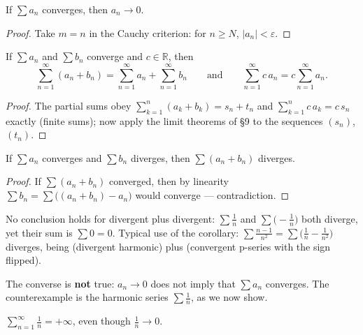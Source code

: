 \documentclass[11pt]{report}
\begin{document}
\begin{corbox}
If $\sum a_n$ converges, then $a_n \to 0$.
\end{corbox}

\begin{proof}
Take $m = n$ in the Cauchy criterion: for $n \geq N$, $|a_n| < \varepsilon$.
\end{proof}

\begin{propbox}
If $\sum a_n$ and $\sum b_n$ converge and $c \in \mathbb{R}$, then
\[
\sum_{n=1}^\infty (a_n + b_n) = \sum_{n=1}^\infty a_n + \sum_{n=1}^\infty b_n
\qquad \text{and} \qquad
\sum_{n=1}^\infty c\,a_n = c \sum_{n=1}^\infty a_n.
\]
\end{propbox}

\begin{proof}
The partial sums obey $\sum_{k=1}^n (a_k + b_k) = s_n + t_n$ and $\sum_{k=1}^n c\,a_k = c\,s_n$ exactly (finite sums); now apply the limit theorems of \S 9 to the sequences $(s_n)$, $(t_n)$.
\end{proof}

\begin{corbox}
If $\sum a_n$ converges and $\sum b_n$ diverges, then $\sum (a_n + b_n)$ diverges.
\end{corbox}

\begin{proof}
If $\sum(a_n + b_n)$ converged, then by linearity $\sum b_n = \sum\bigl((a_n + b_n) - a_n\bigr)$ would converge --- contradiction.
\end{proof}

\begin{rembox}
No conclusion holds for divergent plus divergent: $\sum \tfrac1n$ and $\sum\bigl(-\tfrac1n\bigr)$ both diverge, yet their sum is $\sum 0 = 0$. Typical use of the corollary: $\sum \tfrac{n-1}{n^2} = \sum\bigl( \tfrac1n - \tfrac1{n^2} \bigr)$ diverges, being (divergent harmonic) plus (convergent p-series with the sign flipped).
\end{rembox}

\begin{rembox}[Warning]
The converse is \textbf{not} true: $a_n \to 0$ does not imply that $\sum a_n$ converges. The counterexample is the harmonic series $\sum \tfrac1n$, as we now show.
\end{rembox}

\begin{thmbox}
$\displaystyle\sum_{n=1}^{\infty} \frac1n = +\infty$, even though $\tfrac1n \to 0$.
\end{thmbox}
\end{document}

